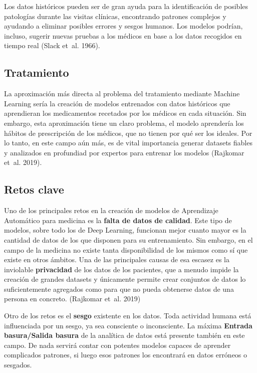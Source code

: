 \documentclass[
  12pt,
  spanish,
  a4paperpaper,
]{report}
\begin{document}
Los datos históricos pueden ser de gran ayuda para la identificación de
posibles patologías durante las visitas clínicas, encontrando patrones
complejos y ayudando a eliminar posibles errores y sesgos humanos. Los
modelos podrían, incluso, sugerir nuevas pruebas a los médicos en base a
los datos recogidos en tiempo real (Slack et~al. 1966).

\hypertarget{tratamiento}{%
\subsection{Tratamiento}\label{tratamiento}}

La aproximación más directa al problema del tratamiento mediante Machine
Learning sería la creación de modelos entrenados con datos históricos
que aprendieran los medicamentos recetados por los médicos en cada
situación. Sin embargo, esta aproximación tiene un claro problema, el
modelo aprendería los hábitos de prescripción de los médicos, que no
tienen por qué ser los ideales. Por lo tanto, en este campo aún más, es
de vital importancia generar datasets fiables y analizados en profundiad
por expertos para entrenar los modelos (Rajkomar et~al. 2019).

\hypertarget{retos-clave}{%
\subsection{Retos clave}\label{retos-clave}}

Uno de los principales retos en la creación de modelos de Aprendizaje
Automático para medicina es la \textbf{falta de datos de calidad}. Este
tipo de modelos, sobre todo los de Deep Learning, funcionan mejor cuanto
mayor es la cantidad de datos de los que disponen para su entrenamiento.
Sin embargo, en el campo de la medicina no existe tanta disponibilidad
de los mismos como sí que existe en otros ámbitos. Una de las
principales causas de esa escasez es la inviolable \textbf{privacidad}
de los datos de los pacientes, que a menudo impide la creación de
grandes datasets y únicamente permite crear conjuntos de datos lo
suficientemente agregados como para que no pueda obtenerse datos de una
persona en concreto. (Rajkomar et~al. 2019)

Otro de los retos es el \textbf{sesgo} existente en los datos. Toda
actividad humana está influenciada por un sesgo, ya sea consciente o
inconsciente. La máxima \textbf{Entrada basura/Salida basura} de la
analítica de datos está presente también en este campo. De nada servirá
contar con potentes modelos capaces de aprender complicados patrones, si
luego esos patrones los encontrará en datos erróneos o sesgados.
\end{document}
